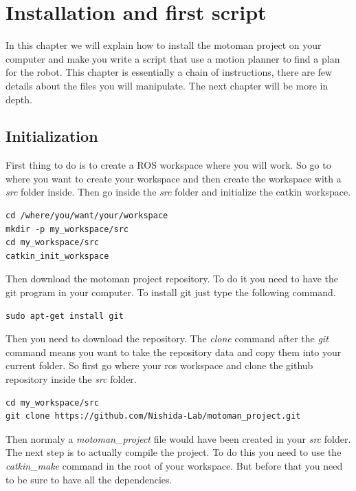 \chapter{Installation and first script}

In this chapter we will explain how to install the motoman project on your computer and make you write a script that use a motion planner to find a plan for the robot. This chapter is essentially a chain of instructions, there are few details about the files you will manipulate. The next chapter will be more in depth.

\section{Initialization}
First thing to do is to create a ROS workspace where you will work.  So go to where you want to create your workspace and then create the workspace with a \emph{src} folder inside. Then go inside the \emph{src} folder and initialize the catkin workspace.

\begin{lstlisting}
cd /where/you/want/your/workspace
mkdir -p my_workspace/src
cd my_workspace/src
catkin_init_workspace
\end{lstlisting}

Then download the motoman project repository. To do it you need to have the git program in your computer. To install git just type the following command.

\begin{lstlisting}
sudo apt-get install git
\end{lstlisting}

Then you need to download the repository. The \emph{clone} command after the \emph{git} command means you want to take the repository data and copy them into your current folder. So first go where your ros workspace and clone the github repository inside the \emph{src} folder.  

\begin{lstlisting}
cd my_workspace/src
git clone https://github.com/Nishida-Lab/motoman_project.git
\end{lstlisting}

Then normaly a \emph{motoman\_project} file would have been created in your \emph{src} folder. The next step is to actually compile the project. To do this you need to use the \emph{catkin\_make} command in the root of your workspace. But before that you need to be sure to have all the dependencies. 


